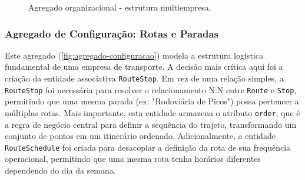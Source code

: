 \begin{figure}[H]
  \centering
  \caption{Agregado organizacional - estrutura multiempresa.}
  \label{fig:agregado-organizacional}
\end{figure}

\subsubsection*{Agregado de Configuração: Rotas e Paradas}

Este agregado (\autoref{fig:agregado-configuracao}) modela a estrutura logística fundamental de uma empresa de transporte. A decisão mais crítica aqui foi a criação da entidade associativa \texttt{RouteStop}. Em vez de uma relação simples, a \texttt{RouteStop} foi necessária para resolver o relacionamento N:N entre \texttt{Route} e \texttt{Stop}, permitindo que uma mesma parada (ex: "Rodoviária de Picos") possa pertencer a múltiplas rotas. Mais importante, esta entidade armazena o atributo \texttt{order}, que é a regra de negócio central para definir a sequência do trajeto, transformando um conjunto de pontos em um itinerário ordenado. Adicionalmente, a entidade \texttt{RouteSchedule} foi criada para desacoplar a definição da rota de sua frequência operacional, permitindo que uma mesma rota tenha horários diferentes dependendo do dia da semana.

